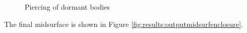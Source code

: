\begin{figure}[!h]
\caption{Piercing of dormant bodies}
\label{fig:results:dormantenclosure}
\end{figure}

The final midsurface is shown in Figure \ref{fig:results:outputmidsurfenclosure}.

